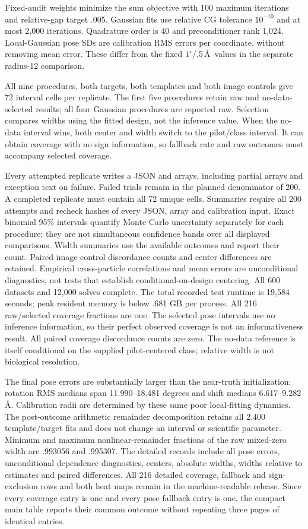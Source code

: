 Fixed-audit weights minimize the sum objective with 100 maximum iterations
and relative-gap target .005. Gaussian fits use relative CG tolerance
$10^{-10}$ and at most 2,000 iterations. Quadrature order is 40 and
preconditioner rank 1,024. Local-Gaussian pose SDs are calibration RMS errors
per coordinate, without removing mean error. These differ from the fixed
$1^\circ$/.5\,\AA\ values in the separate radius-12 comparison.

All nine procedures, both targets, both templates and both image controls
give 72 interval cells per replicate. The first five procedures retain raw
and no-data-selected results; all four Gaussian procedures are reported
raw. Selection compares widths using the fitted design, not the inference
value. When the no-data interval wins, both center and width switch to the
pilot/class interval. It can obtain coverage with no sign information, so
fallback rate and raw outcomes must accompany selected coverage.

Every attempted replicate writes a JSON and arrays, including partial
arrays and exception text on failure. Failed trials remain in the planned
denominator of 200. A completed replicate must contain all 72 unique cells.
Summaries require all 200 attempts and recheck hashes of every JSON, array
and calibration input. Exact binomial 95\% intervals quantify Monte Carlo
uncertainty separately for each procedure; they are not simultaneous
confidence bands over all displayed comparisons. Width summaries use the
available outcomes and report their count. Paired image-control discordance
counts and center differences are retained. Empirical cross-particle
correlations and mean errors are unconditional diagnostics, not tests that
establish conditional-on-design centering.
All 600 datasets and 12,000 solves complete. The total recorded test runtime is 19,584 seconds; peak resident memory is below .681 GB per process. All 216 raw/selected coverage fractions are one. The selected pose intervals use no inference information, so their perfect observed coverage is not an informativeness result. All paired coverage discordance counts are zero. The no-data reference is itself conditional on the supplied pilot-centered class; relative width is not biological resolution.

The final pose errors are substantially larger than the near-truth initialization: rotation RMS medians span 11.990--18.481 degrees and shift medians 6.617--9.282\,\AA. Calibration radii are determined by these same poor local-fitting dynamics. The post-outcome arithmetic remainder decomposition retains all 2,400 template/target fits and does not change an interval or scientific parameter. Minimum and maximum nonlinear-remainder fractions of the raw mixed-zero width are .993056 and .995307. The detailed records include all pose errors, unconditional dependence diagnostics, centers, absolute widths, widths relative to estimates and paired differences.
All 216 detailed coverage, fallback and sign-exclusion rows and both heat maps remain in the machine-readable release. Since every coverage entry is one and every pose fallback entry is one, the compact main table reports their common outcome without repeating three pages of identical entries.



